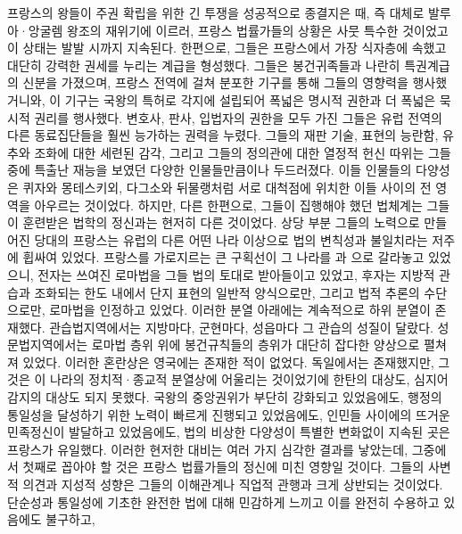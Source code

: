 프랑스의 왕들이 주권 확립을 위한 긴 투쟁을 성공적으로 종결지은 때,
즉 대체로 발루아^^b7앙굴렘 왕조의 재위기에 이르러,
프랑스 법률가들의 상황은 사뭇 특수한 것이었고 이 상태는
 발발 시까지 지속된다.
한편으로, 그들은 프랑스에서 가장 식자층에 속했고
대단히 강력한 권세를 누리는 계급을 형성했다.
그들은 봉건귀족들과 나란히 특권계급의 신분을 가졌으며,
프랑스 전역에 걸쳐 분포한 기구를 통해 그들의 영향력을 행사했거니와,
이 기구는 국왕의 특허로 각지에 설립되어
폭넓은 명시적 권한과 더 폭넓은 묵시적 권리를 행사했다.
변호사, 판사, 입법자의 권한을 모두 가진 그들은 유럽 전역의 다른 동료집단들을
훨씬 능가하는 권력을 누렸다.
그들의 재판 기술, 표현의 능란함, 유추와 조화에 대한 세련된 감각,
그리고 
그들의 정의관에 대한 열정적 헌신
따위는 그들 중에 특출난 재능을 보였던 다양한 인물들만큼이나 두드러졌다.
이들 인물들의 다양성은
퀴자와 몽테스키외, 다그소와
뒤물랭처럼 서로 대척점에 위치한 이들 사이의
전 영역을 아우르는 것이었다.
하지만, 다른 한편으로, 그들이 집행해야 했던 법체계는
그들이 훈련받은 법학의 정신과는 현저히 다른 것이었다.
상당 부분 그들의 노력으로 만들어진 당대의 프랑스는
유럽의 다른 어떤 나라 이상으로 법의 변칙성과 불일치라는 저주에 휩싸여 있었다.
프랑스를 가로지르는 큰 구획선이 그 나라를
과
으로 갈라놓고 있었으니,
전자는 쓰여진 로마법을 그들 법의 토대로 받아들이고 있었고,
후자는 지방적 관습과 조화되는 한도 내에서
단지 표현의 일반적 양식으로만, 그리고
법적 추론의 수단으로만, 로마법을 인정하고 있었다.
이러한 분열 아래에는 계속적으로 하위 분열이 존재했다.
관습법지역에서는 지방마다,
군현마다,
성읍마다 그 관습의 성질이 달랐다.
성문법지역에서는
로마법 층위 위에 봉건규칙들의 층위가 대단히 잡다한 양상으로
펼쳐져 있었다.
이러한 혼란상은 영국에는 존재한 적이 없었다.
독일에서는 존재했지만, 그것은 이 나라의 정치적^^b7종교적 분열상에
어울리는 것이었기에 한탄의 대상도, 심지어 감지의 대상도 되지 못했다.
국왕의 중앙권위가 부단히 강화되고 있었음에도,
행정의 통일성을 달성하기 위한 노력이 빠르게 진행되고 있었음에도,
인민들 사이에의 뜨거운 민족정신이 발달하고 있었음에도,
법의 비상한 다양성이 특별한 변화없이 지속된 곳은 프랑스가 유일했다.
이러한 현저한 대비는 여러 가지 심각한 결과를 낳았는데,
그중에서 첫째로 꼽아야 할 것은 프랑스 법률가들의 정신에 미친 영향일 것이다.
그들의 사변적 의견과 지성적 성향은 그들의 이해관계나 직업적 관행과
크게 상반되는 것이었다.
단순성과 통일성에 기초한 완전한 법에 대해 민감하게 느끼고 이를 완전히
수용하고 있음에도 불구하고,
